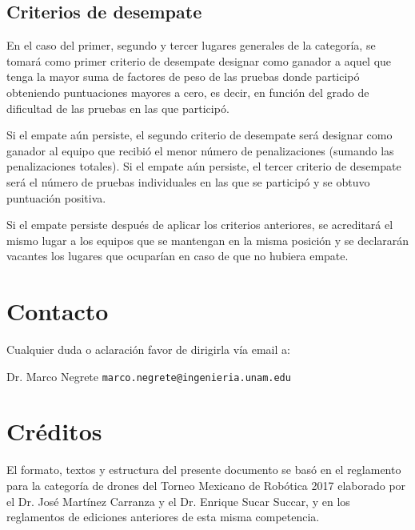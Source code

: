 \documentclass[letterpaper,12pt]{article}
\begin{document}
\subsection{Criterios de desempate}
En el caso del primer, segundo y tercer lugares generales de la categoría, se tomará como primer criterio de desempate designar como ganador a aquel que tenga la mayor suma de factores de peso de las pruebas donde participó obteniendo puntuaciones mayores a cero, es decir, en función del grado de dificultad de las pruebas en las que participó.

Si el empate aún persiste, el segundo criterio de desempate será designar como ganador al equipo que recibió el menor número de penalizaciones (sumando las penalizaciones totales). Si el empate aún persiste, el tercer criterio de desempate será el número de pruebas individuales en las que se participó y se obtuvo puntuación positiva.

Si el empate persiste después de aplicar los criterios anteriores, se acreditará el mismo lugar a los equipos que se mantengan en la misma posición y se declararán vacantes los lugares que ocuparían en caso de que no hubiera empate.

\section{Contacto}
Cualquier duda o aclaración favor de dirigirla vía email a:

Dr. Marco Negrete \texttt{marco.negrete@ingenieria.unam.edu}


\section*{Créditos}
El formato, textos y estructura del presente documento se basó en el reglamento para la categoría de drones del Torneo Mexicano de Robótica 2017 elaborado por el Dr. José Martínez Carranza y el Dr. Enrique Sucar Succar, y en los reglamentos de ediciones anteriores de esta misma competencia. 
\end{document}
